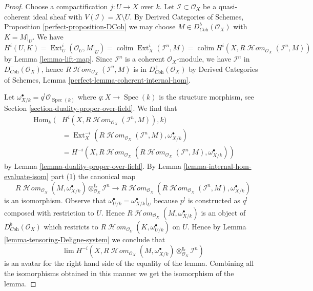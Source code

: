 \documentclass{stacks-project}
\theoremstyle{plain}
\theoremstyle{definition}
\theoremstyle{remark}
\numberwithin{equation}{subsection}
\def\lim{\mathop{\mathrm{lim}}\nolimits}
\def\colim{\mathop{\mathrm{colim}}\nolimits}
\def\Spec{\mathop{\mathrm{Spec}}}
\def\Hom{\mathop{\mathrm{Hom}}\nolimits}
\def\Ext{\mathop{\mathrm{Ext}}\nolimits}
\def\SheafHom{\mathop{\mathcal{H}\!\mathit{om}}\nolimits}
\begin{document}
\begin{proof}
Choose a compactification $j : U \to X$ over $k$. Let
$\mathcal{I} \subset \mathcal{O}_X$ be a quasi-coherent ideal
sheaf with $V(\mathcal{I}) = X \setminus U$.
By Derived Categories of Schemes, Proposition \ref{perfect-proposition-DCoh}
we may choose $M \in D^b_{\textit{Coh}}(\mathcal{O}_X)$
with $K = M|_U$. We have
$$
H^i(U, K) =
\Ext^i_U(\mathcal{O}_U, M|_U) =
\colim \Ext^i_X(\mathcal{I}^n, M) =
\colim H^i(X, R\SheafHom_{\mathcal{O}_X}(\mathcal{I}^n, M))
$$
by Lemma \ref{lemma-lift-map}.
Since $\mathcal{I}^n$ is a coherent $\mathcal{O}_X$-module,
we have $\mathcal{I}^n$ in $D^-_{\textit{Coh}}(\mathcal{O}_X)$,
hence $R\SheafHom_{\mathcal{O}_X}(\mathcal{I}^n, M)$ is in
$D^+_{\textit{Coh}}(\mathcal{O}_X)$ by
Derived Categories of Schemes, Lemma
\ref{perfect-lemma-coherent-internal-hom}.

\medskip\noindent
Let $\omega_{X/k}^\bullet = q^!\mathcal{O}_{\Spec(k)}$ where
$q : X \to \Spec(k)$ is the structure morphism, see
Section \ref{section-duality-proper-over-field}. We find that
\begin{align*}
\Hom_k(
&
H^i(X, R\SheafHom_{\mathcal{O}_X}(\mathcal{I}^n, M)), k) \\
& =
\Ext^{-i}_X(R\SheafHom_{\mathcal{O}_X}(\mathcal{I}^n, M),
\omega_{X/k}^\bullet) \\
& =
H^{-i}(X, R\SheafHom_{\mathcal{O}_X}(R\SheafHom_{\mathcal{O}_X}(
\mathcal{I}^n, M), \omega_{X/k}^\bullet))
\end{align*}
by Lemma \ref{lemma-duality-proper-over-field}. By
Lemma \ref{lemma-internal-hom-evaluate-isom} part (1) the canonical map
$$
R\SheafHom_{\mathcal{O}_X}(M, \omega_{X/k}^\bullet)
\otimes_{\mathcal{O}_X}^\mathbf{L} \mathcal{I}^n
\longrightarrow
R\SheafHom_{\mathcal{O}_X}(R\SheafHom_{\mathcal{O}_X}(
\mathcal{I}^n, M), \omega_{X/k}^\bullet)
$$
is an isomorphism. Observe that
$\omega^\bullet_{U/k} = \omega^\bullet_{X/k}|_U$
because $p^!$ is constructed as $q^!$ composed with restriction to $U$.
Hence $R\SheafHom_{\mathcal{O}_X}(M, \omega_{X/k}^\bullet)$ is
an object of $D^b_{\textit{Coh}}(\mathcal{O}_X)$ which restricts
to $R\SheafHom_{\mathcal{O}_U}(K, \omega_{U/k}^\bullet)$ on $U$.
Hence by Lemma \ref{lemma-tensoring-Deligne-system} we conclude that
$$
\lim H^{-i}(X, R\SheafHom_{\mathcal{O}_X}(M, \omega_{X/k}^\bullet)
\otimes_{\mathcal{O}_X}^\mathbf{L} \mathcal{I}^n)
$$
is an avatar for the right hand side of the equality of the lemma.
Combining all the isomorphisms obtained in this manner we get
the isomorphism of the lemma.
\end{proof}
\end{document}
